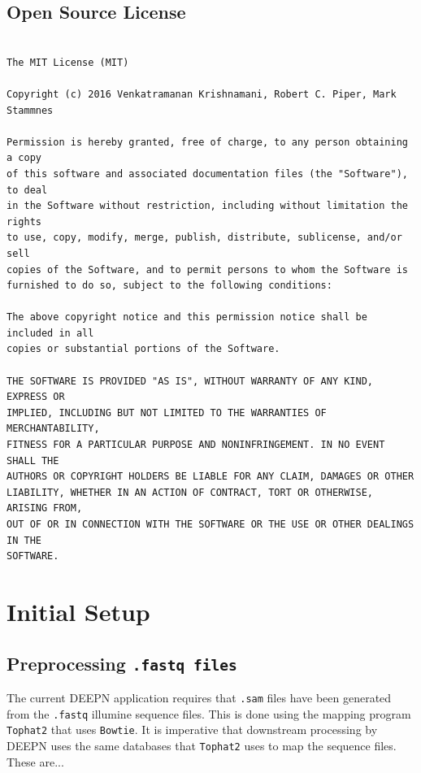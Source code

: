 \documentclass[11pt,fleqn]{book} %
\begin{document}
\section{Open Source License}\label{license}
\begin{lstlisting}

The MIT License (MIT)

Copyright (c) 2016 Venkatramanan Krishnamani, Robert C. Piper, Mark Stammnes

Permission is hereby granted, free of charge, to any person obtaining a copy
of this software and associated documentation files (the "Software"), to deal
in the Software without restriction, including without limitation the rights
to use, copy, modify, merge, publish, distribute, sublicense, and/or sell
copies of the Software, and to permit persons to whom the Software is
furnished to do so, subject to the following conditions:

The above copyright notice and this permission notice shall be included in all
copies or substantial portions of the Software.

THE SOFTWARE IS PROVIDED "AS IS", WITHOUT WARRANTY OF ANY KIND, EXPRESS OR
IMPLIED, INCLUDING BUT NOT LIMITED TO THE WARRANTIES OF MERCHANTABILITY,
FITNESS FOR A PARTICULAR PURPOSE AND NONINFRINGEMENT. IN NO EVENT SHALL THE
AUTHORS OR COPYRIGHT HOLDERS BE LIABLE FOR ANY CLAIM, DAMAGES OR OTHER
LIABILITY, WHETHER IN AN ACTION OF CONTRACT, TORT OR OTHERWISE, ARISING FROM,
OUT OF OR IN CONNECTION WITH THE SOFTWARE OR THE USE OR OTHER DEALINGS IN THE
SOFTWARE.
\end{lstlisting}


\chapter{Initial Setup}

\section{Preprocessing \texttt{.fastq files}}

The current DEEPN application requires that \texttt{.sam} files have been generated from the \texttt{.fastq} illumine sequence files.  This is done using the mapping program \texttt{Tophat2} that uses \texttt{Bowtie}.  It is imperative that downstream processing by DEEPN uses the same databases that \texttt{Tophat2} uses to map the sequence files. These are...
\end{document}

